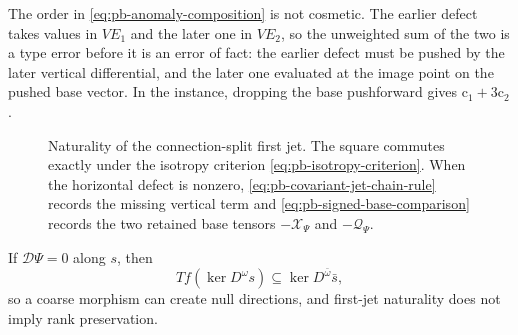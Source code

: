 The order in \eqref{eq:pb-anomaly-composition} is not cosmetic. The earlier defect takes values in
\(VE_1\) and the later one in \(VE_2\), so the unweighted sum of the two is a type error before it is
an error of fact: the earlier defect must be pushed by the later vertical differential, and the later
one evaluated at the image point on the pushed base vector. In the instance, dropping the base
pushforward gives \(\mathrm c_1+3\mathrm c_2\).

\begin{figure}[htbp]
\centering
{}
\caption{Naturality of the connection-split first jet. The square commutes exactly under the isotropy
criterion \eqref{eq:pb-isotropy-criterion}. When the horizontal defect is nonzero,
\eqref{eq:pb-covariant-jet-chain-rule} records the missing vertical term and
\eqref{eq:pb-signed-base-comparison} records the two retained base tensors \(-\mathcal X_\Psi\) and
\(-\mathcal Q_\Psi\).}
\label{fig:pb-pullback-naturality}
\end{figure}

If \(\mathcal D\Psi=0\) along \(s\), then
\begin{equation}
Tf(\ker D^\omega s)\subseteq\ker D^{\bar\omega}\bar s,
\label{eq:pb-coarse-null-inclusion}
\end{equation}
so a coarse morphism can create null directions, and first-jet naturality does not imply rank
preservation. 

